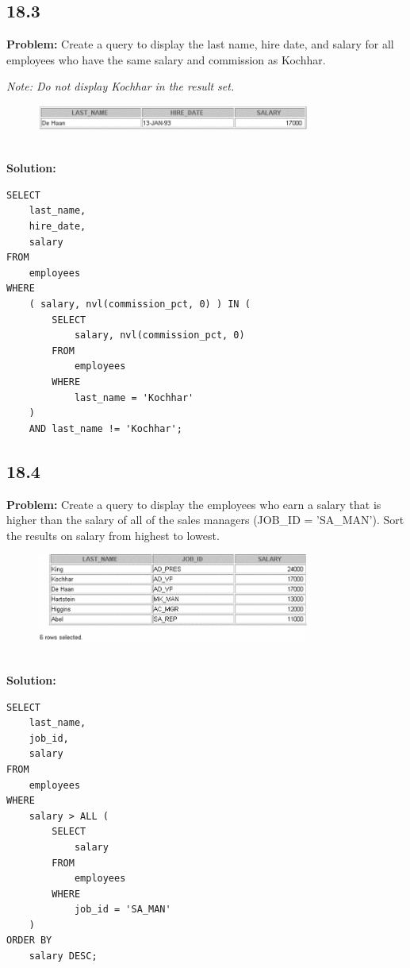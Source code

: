 \documentclass[12pt,a4paper]{article}
\begin{document}
\begin{itemize}
\subsection*{18.3}
\textbf{Problem:} Create a query to display the last name, hire date, and salary for all employees who have the same salary and commission as Kochhar.

\textit{Note: Do not display Kochhar in the result set.}
\\
\begin{figure}[htbp]
  \centering
  \includegraphics[width=0.8\textwidth]{Screenshots/183.png}
\end{figure}\\
\textbf{Solution:}
\begin{lstlisting}
SELECT 
    last_name,
    hire_date,
    salary
FROM
    employees
WHERE
    ( salary, nvl(commission_pct, 0) ) IN (
        SELECT
            salary, nvl(commission_pct, 0)
        FROM
            employees
        WHERE
            last_name = 'Kochhar'
    )
    AND last_name != 'Kochhar';
\end{lstlisting}

\subsection*{18.4}
\textbf{Problem:} Create a query to display the employees who earn a salary that is higher than the salary of all of the sales managers (JOB\_ID = 'SA\_MAN'). Sort the results on salary from highest to lowest.
\\
\begin{figure}[htbp]
  \centering
  \includegraphics[width=0.8\textwidth]{Screenshots/184.png}
\end{figure}\\
\textbf{Solution:}
\begin{lstlisting}
SELECT 
    last_name,
    job_id,
    salary
FROM
    employees
WHERE
    salary > ALL (
        SELECT
            salary
        FROM
            employees
        WHERE
            job_id = 'SA_MAN'
    )
ORDER BY
    salary DESC;
\end{lstlisting}


\end{itemize}
\end{document}

